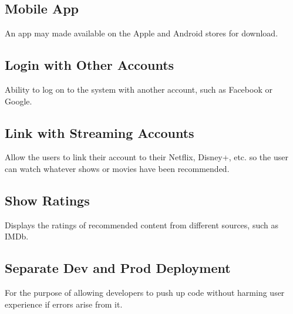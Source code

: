 \documentclass{article}
\begin{document}
\subsection{Mobile App}
An app may made available on the Apple and Android stores for download.

\subsection{Login with Other Accounts}
Ability to log on to the system with another account, such as Facebook or Google.

\subsection{Link with Streaming Accounts}
Allow the users to link their account to their Netflix, Disney+, etc. so the user can watch whatever shows or movies have been recommended.

\subsection{Show Ratings}
Displays the ratings of recommended content from different sources, such as IMDb.

\subsection{Separate Dev and Prod Deployment}
For the purpose of allowing developers to push up code without harming user experience if errors arise from it.
\end{document}
